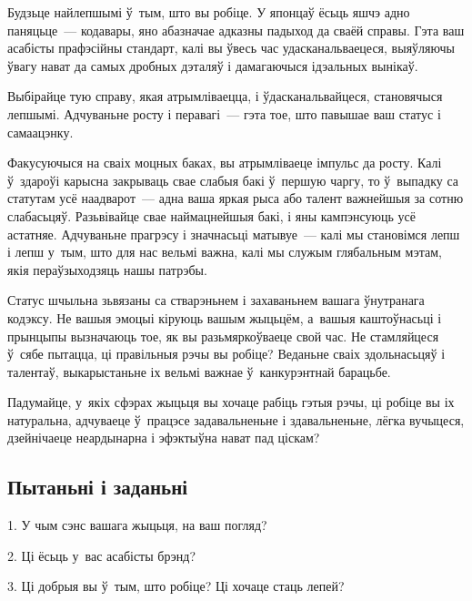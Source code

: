 Будзьце найлепшымі ў~тым, што вы робіце. У японцаў ёсьць яшчэ адно паняцьце~--- кодавары, яно абазначае адказны падыход да сваёй справы. Гэта ваш асабісты прафэсійны стандарт, калі вы ўвесь час удасканальваецеся, выяўляючы ўвагу нават да самых дробных дэталяў і дамагаючыся ідэальных вынікаў.

Выбірайце тую справу, якая атрымліваецца, і ўдасканальвайцеся, становячыся лепшымі. Адчуваньне росту і перавагі~--- гэта тое, што павышае ваш статус і самаацэнку.

Факусуючыся на сваіх моцных баках, вы атрымліваеце імпульс да росту. Калі ў~здароўі карысна закрываць свае слабыя бакі ў~першую чаргу, то ў~выпадку са статутам усё наадварот~--- адна ваша яркая рыса або талент важнейшыя за сотню слабасьцяў. Разьвівайце свае наймацнейшыя бакі, і яны кампэнсуюць усё астатняе. Адчуваньне прагрэсу і значнасьці матывуе~--- калі мы становімся лепш і лепш у~тым, што для нас вельмі важна, калі мы служым глябальным мэтам, якія пераўзыходзяць нашы патрэбы.

Статус шчыльна зьвязаны са стварэньнем і захаваньнем вашага ўнутранага кодэксу. Не вашыя эмоцыі кіруюць вашым жыцьцём, а~вашыя каштоўнасьці і прынцыпы вызначаюць тое, як вы разьмяркоўваеце свой час. Не стамляйцеся ў~сябе пытацца, ці правільныя рэчы вы робіце? Веданьне сваіх здольнасьцяў і талентаў, выкарыстаньне іх вельмі важнае ў~канкурэнтнай барацьбе.

Падумайце, у~якіх сфэрах жыцьця вы хочаце рабіць гэтыя рэчы, ці робіце вы іх натуральна, адчуваеце ў~працэсе задавальненьне і здавальненьне, лёгка вучыцеся, дзейнічаеце неардынарна і эфэктыўна нават пад ціскам?

\subsection*{Пытаньні і заданьні}

1. У чым сэнс вашага жыцьця, на ваш погляд?

2. Ці ёсьць у~вас асабісты брэнд?

3. Ці добрыя вы ў~тым, што робіце? Ці хочаце стаць лепей?

